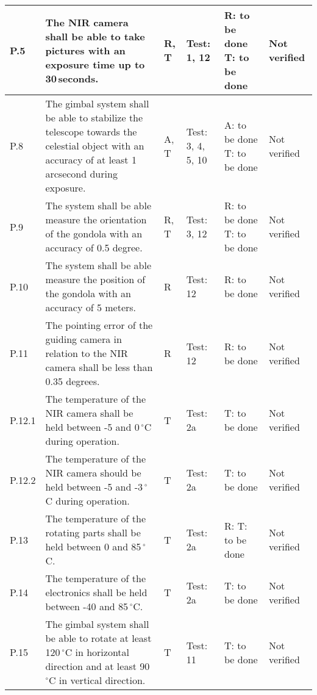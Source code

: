 \begin{longtable}[]{|m{}| m{}|m{}|m{}|m{}|m{}|}
P.5 & The NIR camera shall be able to take pictures with an exposure time up to 30\,seconds.
& R, T & Test: 1, 12 & R: to be done \newline T: to be done & Not verified \\\hline

  P.8 & The gimbal system shall be able to stabilize the telescope towards the celestial object with an accuracy of at least 1 arcsecond during exposure.
& A, T & Test: 3, 4, 5, 10 & A: to be done \newline T: to be done & Not verified \\\hline

  P.9 & The system shall be able measure the orientation of the gondola with an accuracy of 0.5 degree.
& R, T & Test: 3, 12 & R: to be done \newline T: to be done  & Not verified \\\hline

  P.10 & The system shall be able measure the position of the gondola with an accuracy of 5 meters.
& R & Test: 12 & R: to be done & Not verified \\\hline

  P.11 & The pointing error of the guiding camera in relation to the NIR camera shall be less than 0.35 degrees.
& R & Test: 12 & R: to be done & Not verified \\\hline

  P.12.1 & The temperature of the NIR camera shall be held between -5 and 0\,$^\circ$C during operation.
& T & Test: 2a & T: to be done & Not verified \\\hline

  P.12.2 & The temperature of the NIR camera should be held between -5 and -3\,$^\circ$C during operation.
& T & Test: 2a &  T: to be done & Not verified \\\hline

  P.13 & The temperature of the rotating parts shall be held between 0 and 85\,$^\circ$C.
& T & Test: 2a & R: T: to be done & Not verified \\\hline

  P.14 & The temperature of the electronics shall be held between -40 and 85\,$^\circ$C.
& T & Test: 2a & T: to be done & Not verified \\\hline

P.15 & The gimbal system shall be able to rotate at least 120\,$^\circ$C in horizontal direction and at least 90\,$^\circ$C in vertical direction.
& T & Test: 11 & T: to be done & Not verified \\\hline




\end{longtable}
